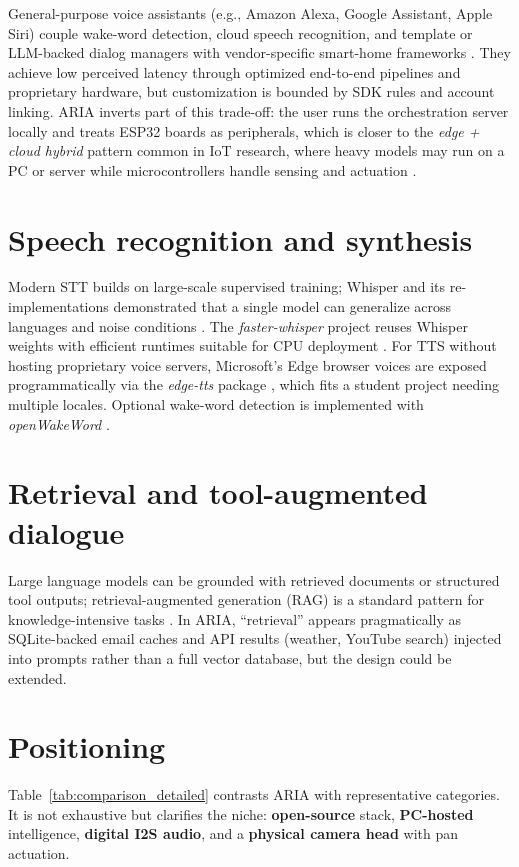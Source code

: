 \documentclass[12pt,a4paper]{report}
\begin{document}
General-purpose voice assistants (e.g., Amazon Alexa, Google Assistant, Apple Siri) couple wake-word detection, cloud speech recognition, and template or LLM-backed dialog managers with vendor-specific smart-home frameworks \cite{flask}. They achieve low perceived latency through optimized end-to-end pipelines and proprietary hardware, but customization is bounded by SDK rules and account linking. ARIA inverts part of this trade-off: the user runs the orchestration server locally and treats ESP32 boards as peripherals, which is closer to the \textit{edge + cloud hybrid} pattern common in IoT research, where heavy models may run on a PC or server while microcontrollers handle sensing and actuation \cite{esp-idf}.

\section{Speech recognition and synthesis}

Modern STT builds on large-scale supervised training; Whisper and its re-implementations demonstrated that a single model can generalize across languages and noise conditions \cite{whisper}. The \textit{faster-whisper} project reuses Whisper weights with efficient runtimes suitable for CPU deployment \cite{faster-whisper}. For TTS without hosting proprietary voice servers, Microsoft's Edge browser voices are exposed programmatically via the \textit{edge-tts} package \cite{edge-tts}, which fits a student project needing multiple locales. Optional wake-word detection is implemented with \textit{openWakeWord} \cite{openwakeword}.

\section{Retrieval and tool-augmented dialogue}

Large language models can be grounded with retrieved documents or structured tool outputs; retrieval-augmented generation (RAG) is a standard pattern for knowledge-intensive tasks \cite{rag}. In ARIA, ``retrieval'' appears pragmatically as SQLite-backed email caches and API results (weather, YouTube search) injected into prompts rather than a full vector database, but the design could be extended.

\section{Positioning}

Table~\ref{tab:comparison_detailed} contrasts ARIA with representative categories. It is not exhaustive but clarifies the niche: \textbf{open-source} stack, \textbf{PC-hosted} intelligence, \textbf{digital I2S audio}, and a \textbf{physical camera head} with pan actuation.
\end{document}
